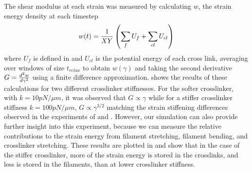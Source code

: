 \documentclass[12pt]{article}
\begin{document}
The shear modulus at each strain was measured by calculating $w$, the strain energy density at each timestep
\begin{equation}
  w(t) = {1\over X Y}\left(\sum_f{ U_f}+\sum_{cl}{U_{cl}}\right)
  \label{eqn:sed}
\end{equation}
where $U_f$ is defined in  and $U_{cl}$ is the potential energy of each cross link, averaging
over windows of size $t_{relax}$ to obtain $w(\gamma)$ and taking the second derivative $G = {d^2w\over d\gamma^2}$ using a finite
difference approximation.  shows the results of these calculations for two different
crosslinker stiffnesses. For the softer crosslinker, with $k=10pN/\mu m$, it was observed that $G\propto\gamma$ while
for a stiffer crosslinker stiffness $k=100pN/\mu m$, $G\propto\gamma^{3/2}$ matching the strain
stiffening differences observed in the experiments of \cite{gardel2004} and \cite{kasza2009}. However, our
simulation can also provide further insight into this experiment, because we can measure the relative contributions to
the strain energy from filament stretching, filament bending, and crosslinker stretching. These results are plotted in
 and show that in the case of the stiffer crosslinker, more of the strain energy is stored in the
crosslinks, and less is stored in the filaments, than at lower crosslinker stiffness. 
\end{document}
